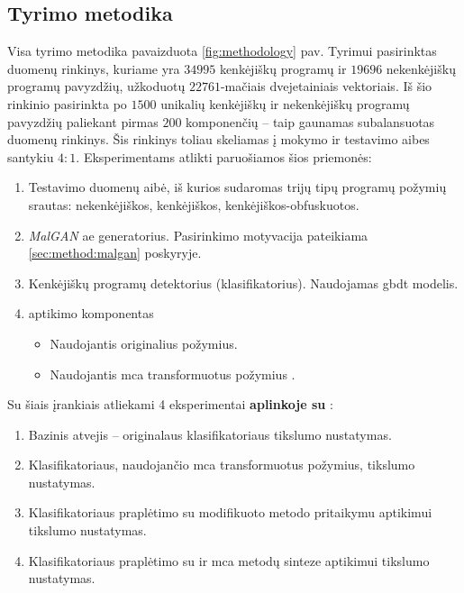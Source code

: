 
\subsection{Tyrimo metodika}\label{sec:exp:methodology}

Visa tyrimo metodika pavaizduota \ref{fig:methodology} pav. Tyrimui pasirinktas \SLEIPNIR \cite{al-dujailiAdversarialDeepLearning2018} duomenų rinkinys, kuriame yra $34995$ kenkėjiškų programų ir $19696$ nekenkėjiškų programų pavyzdžių, užkoduotų $22761$-mačiais dvejetainiais vektoriais. Iš šio rinkinio pasirinkta po $1500$ unikalių kenkėjiškų ir nekenkėjiškų programų pavyzdžių paliekant pirmas $200$ komponenčių -- taip gaunamas subalansuotas duomenų rinkinys. Šis rinkinys toliau skeliamas į mokymo ir testavimo aibes santykiu $4:1$.
Eksperimentams atlikti paruošiamos šios priemonės:
\begin{enumerate}
    \item Testavimo duomenų aibė, iš kurios sudaromas trijų tipų programų požymių srautas: nekenkėjiškos, kenkėjiškos, kenkėjiškos-obfuskuotos.
    \item \textit{MalGAN} \cite{huGeneratingAdversarialMalware2017} \gls{ae} generatorius. Pasirinkimo motyvacija pateikiama \ref{sec:method:malgan} poskyryje.
    \item Kenkėjiškų programų detektorius (klasifikatorius). Naudojamas \gls{gbdt} modelis.
    \item {} aptikimo komponentas
    \begin{itemize}
        \item Naudojantis originalius požymius.
        \item Naudojantis \gls{mca} transformuotus požymius .
    \end{itemize}
\end{enumerate}

\noindent
Su šiais įrankiais atliekami 4 eksperimentai \textbf{aplinkoje su }:
    \begin{enumerate}
        \item Bazinis atvejis -- originalaus klasifikatoriaus tikslumo nustatymas.
        \item Klasifikatoriaus, naudojančio \gls{mca} transformuotus požymius, tikslumo nustatymas.
        \item Klasifikatoriaus praplėtimo su modifikuoto \LIME metodo pritaikymu  aptikimui tikslumo nustatymas.
        \item Klasifikatoriaus praplėtimo su \LIME ir \gls{mca} metodų sinteze  aptikimui tikslumo nustatymas.
    \end{enumerate}


